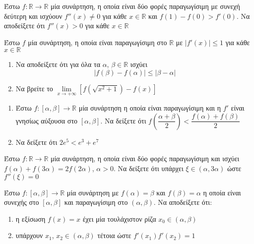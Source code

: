 \documentclass{presentation}
\begin{document}
\begin{askisi}
    Έστω $f:\mathbb{R}\to\mathbb{R}$ μία συνάρτηση, η οποία είναι δύο φορές παραγωγίσιμη με συνεχή δεύτερη και ισχύουν $f''(x)\ne 0$ για κάθε $x\in\mathbb{R}$ και $f(1)-f(0)>f'(0)$. Να αποδείξετε ότι $f''(x)>0$ για κάθε $x\in\mathbb{R}$

\end{askisi}

\begin{askisi}
    Έστω $f$ μία συνάρτηση, η οποία είναι παραγωγίσιμη στο $\mathbb{R}$ με $|f'(x)|\le 1$ για κάθε $x\in\mathbb{R}$
    \begin{enumerate}
        \item<1-> Να αποδείξετε ότι για όλα τα $α$, $β\in\mathbb{R}$ ισχύει
              $$|f(β)-f(α)|\le |β-α|$$
        \item<2-> Να βρείτε το $\lim\limits_{x \to +\infty}{ \left[  f\left( \sqrt{x^2+1} \right)-f(x)  \right]}$
    \end{enumerate}
\end{askisi}

\begin{askisi}
    \begin{enumerate}
        \item<1-> Έστω $f:[α,β]\to\mathbb{R}$ μία συνάρτηση η οποία είναι παραγωγίσιμη και η $f'$ είναι γνησίως αύξουσα στο $[α,β]$. Να δείξετε ότι $f\left( \dfrac{α+β}{2} \right)<\dfrac{f(α)+f(β)}{2} $
        \item<2-> Να δείξετε ότι $2e^5<e^3+e^7$
    \end{enumerate}

\end{askisi}

\begin{askisi}
    Έστω $f:\mathbb{R}\to\mathbb{R}$ μία συνάρτηση, η οποία είναι δύο φορές παραγωγίσιμη και ισχύει $f(α)+f(3α)=2f(2α)$, $α>0$. Να δείξετε ότι υπάρχει $ξ\in (α,3α)$ ώστε $f''(ξ)=0$

\end{askisi}

\begin{askisi}
    Έστω $f:[α,β]\to\mathbb{R}$ μία συνάρτηση με $f(α)=β$ και $f(β)=α$ η οποία είναι συνεχής στο $[α,β]$ και παραγωγίσιμη στο $(α,β)$. Να αποδείξετε ότι:
    \begin{enumerate}
        \item<1-> η εξίσωση $f(x)=x$ έχει μία τουλάχιστον ρίζα $x_0\in (α,β)$
        \item<2-> υπάρχουν $x_1$, $x_2\in (α,β)$ τέτοια ώστε $f'(x_1)f'(x_2)=1$
    \end{enumerate}

\end{askisi}
\end{document}
